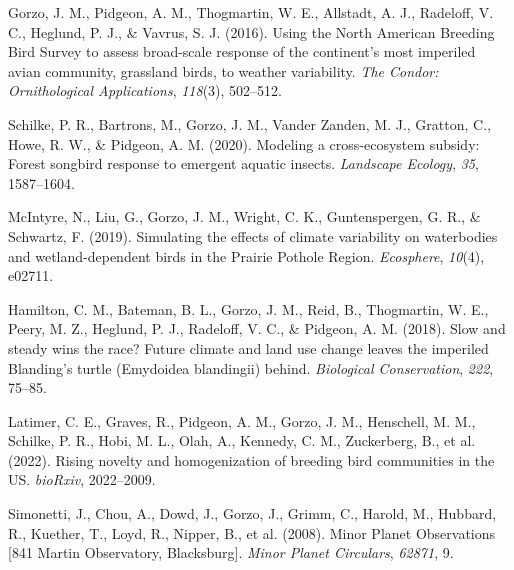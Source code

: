 \documentclass[11pt,a4paper,]{awesome-cv}
\newlength{\cslhangindent}
\newenvironment{CSLReferences}[2] %
 {\begin{list}{}{%
  \setlength{\itemindent}{0pt}
  \setlength{\leftmargin}{0pt}
  \setlength{\parsep}{0pt}
  \ifodd #1
   \setlength{\leftmargin}{\cslhangindent}
   \setlength{\itemindent}{-1\cslhangindent}
  \fi
  \setlength{\itemsep}{#2\baselineskip}}}
 {\end{list}}
\renewcommand{\section}[1]{%
	\vspace{\acvSectionTopSkip}
	\sectionstyle{#1}
	\phantomsection
	\color{gray}\vhrulefill{0.9pt}
}
\begin{document}
\label{refs-ac9b1bd4beeebee61ed7fb33c33f685f}
\begin{CSLReferences}{1}{0}
Gorzo, J. M., Pidgeon, A. M., Thogmartin, W. E., Allstadt, A. J.,
Radeloff, V. C., Heglund, P. J., \& Vavrus, S. J. (2016). Using the
North American Breeding Bird Survey to assess broad-scale response of
the continent's most imperiled avian community, grassland birds, to
weather variability. \emph{The Condor: Ornithological Applications},
\emph{118}(3), 502--512.

Schilke, P. R., Bartrons, M., Gorzo, J. M., Vander Zanden, M. J.,
Gratton, C., Howe, R. W., \& Pidgeon, A. M. (2020). Modeling a
cross-ecosystem subsidy: Forest songbird response to emergent aquatic
insects. \emph{Landscape Ecology}, \emph{35}, 1587--1604.

McIntyre, N., Liu, G., Gorzo, J. M., Wright, C. K., Guntenspergen, G.
R., \& Schwartz, F. (2019). Simulating the effects of climate
variability on waterbodies and wetland-dependent birds in the Prairie
Pothole Region. \emph{Ecosphere}, \emph{10}(4), e02711.

Hamilton, C. M., Bateman, B. L., Gorzo, J. M., Reid, B., Thogmartin, W.
E., Peery, M. Z., Heglund, P. J., Radeloff, V. C., \& Pidgeon, A. M.
(2018). Slow and steady wins the race? Future climate and land use
change leaves the imperiled Blanding's turtle (Emydoidea blandingii)
behind. \emph{Biological Conservation}, \emph{222}, 75--85.

Latimer, C. E., Graves, R., Pidgeon, A. M., Gorzo, J. M., Henschell, M.
M., Schilke, P. R., Hobi, M. L., Olah, A., Kennedy, C. M., Zuckerberg,
B., et al. (2022). Rising novelty and homogenization of breeding bird
communities in the US. \emph{bioRxiv}, 2022--2009.

Simonetti, J., Chou, A., Dowd, J., Gorzo, J., Grimm, C., Harold, M.,
Hubbard, R., Kuether, T., Loyd, R., Nipper, B., et al. (2008). Minor
Planet Observations {[}841 Martin Observatory, Blacksburg{]}.
\emph{Minor Planet Circulars}, \emph{62871}, 9.

\end{CSLReferences}

\section{Conference Presentations}\label{conference-presentations}
\end{document}
